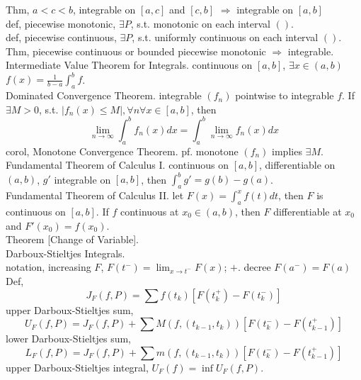 \documentclass[paper=a4, fontsize=11pt]{scrartcl} %
\numberwithin{equation}{section} %
\numberwithin{figure}{section} %
\numberwithin{table}{section} %
\begin{document}
Thm, $a<c<b$, integrable on $[a,c]$ and $[c,b]$ $\Rightarrow$ integrable on $[a,b]$\\
def, piecewise monotonic, $\exists P$, s.t. monotonic on each interval $()$.\\
def, piecewise continuous, $\exists P$, s.t. uniformly continuous on each interval $()$.\\
Thm, piecewise continuous or bounded piecewise monotonic $\Rightarrow$ integrable.\\
Intermediate Value Theorem for Integrals. continuous on $[a,b]$, $\exists x\in(a,b)$ $f(x) = \frac{1}{b-a} \int_a^b f $.\\
Dominated Convergence Theorem. integrable $(f_n)$ pointwise to integrable $f$. If $\exists M>0$, s.t. $|f_n(x)\leq M|, \forall n\forall x\in[a,b]$, then
\begin{equation}
\lim_{n\rightarrow \infty} \int_a^b f_n(x)dx = \int_a^b \lim_{n\rightarrow \infty} f_n(x) dx
\end{equation}
corol, Monotone Convergence Theorem. pf. monotone $(f_n)$ implies $\exists M$.\\
Fundamental Theorem of Calculus I. continuous on $[a,b]$, differentiable on $(a,b)$, $g'$ integrable on $[a,b]$, then $\int_a^b g' = g(b) - g(a)$.\\
Fundamental Theorem of Calculus II. let $F(x) = \int_a^x f(t)dt$, then $F$ is continuous on $[a,b]$. If $f$ continuous at $x_0\in(a,b)$, then $F$ differentiable at $x_0$ and $F'(x_0)=f(x_0)$.\\
Theorem [Change of Variable].\\
Darboux-Stieltjes Integrals.\\
notation, increasing $F$, $F(t^-) = \lim_{x\rightarrow t^-} F(x)$; $+$. decree $F(a^-)=F(a)$\\
Def, \begin{equation}
J_F(f,P) = \sum f(t_k) [F(t_k^+) - F(t_k^-)]
\end{equation}
upper Darboux-Stieltjes sum,
\begin{equation}
U_F(f,P) = J_F(f,P) + \sum M(f,(t_{k-1}, t_k)) [F(t_k^-) - F(t_{k-1}^+)]
\end{equation}
lower Darboux-Stieltjes sum,
\begin{equation}
L_F(f,P) = J_F(f,P) + \sum m(f,(t_{k-1}, t_k)) [F(t_k^-) - F(t_{k-1}^+)]
\end{equation}
upper Darboux-Stieltjes integral, $U_F(f) = \inf U_F(f,P)$.\\
\end{document}
